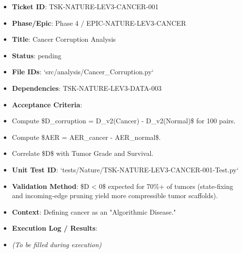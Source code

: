 \documentclass{article}
\begin{document}
\begin{itemize}
\item   \textbf{Ticket ID}: TSK-NATURE-LEV3-CANCER-001
\item   \textbf{Phase/Epic}: Phase 4 / EPIC-NATURE-LEV3-CANCER
\item   \textbf{Title}: Cancer Corruption Analysis
\item   \textbf{Status}: pending
\item   \textbf{File IDs}: `src/analysis/Cancer\_Corruption.py`
\item   \textbf{Dependencies}: TSK-NATURE-LEV3-DATA-003
\item   \textbf{Acceptance Criteria}:
\item   Compute \$\Delta D\_{corruption} = D\_{v2}(Cancer) - D\_{v2}(Normal)\$ for 100 pairs.
\item   Compute \$\Delta AER = AER\_{cancer} - AER\_{normal}\$.
\item   Correlate \$\Delta D\$ with Tumor Grade and Survival.
\item   \textbf{Unit Test ID}: `tests/Nature/TSK-NATURE-LEV3-CANCER-001-Test.py`
\item   \textbf{Validation Method}: \$\Delta D < 0\$ expected for 70\%+ of tumors (state-fixing and incoming-edge pruning yield more compressible tumor scaffolds).
\item   \textbf{Context}: Defining cancer as an "Algorithmic Disease."
\item   \textbf{Execution Log / Results}:
\item   \textit{(To be filled during execution)}
\end{itemize}
\end{document}
